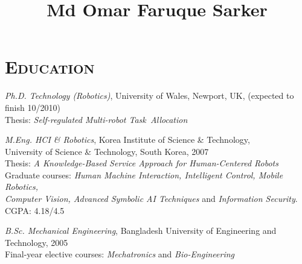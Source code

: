 \documentclass[notopicbreak,contbibnum,plain]{simplecv}
\begin{document}


%
\title{\Large Md Omar Faruque Sarker}
%
\maketitle
\vspace*{-1cm}
\section{\textsc{Education}}
\label{edu}
\begin{topic}
    \item \emph{Ph.D. Technology (Robotics)}, 
    University of Wales, Newport, UK, (expected to finish 10/2010)\\
    Thesis: \textit{Self-regulated Multi-robot 				Task~Allocation}
\vspace*{-0.1cm}
    \item \emph{M.Eng. HCI \& Robotics},  
    Korea Institute of Science \& Technology,\\ University of Science \& Technology, South Korea, 2007\\ 
        Thesis: \textit{A Knowledge-Based Service Approach
for Human-Centered Robots}\\
Graduate courses: \emph{Human Machine Interaction, Intelligent Control, Mobile Robotics,\\ Computer Vision, Advanced Symbolic AI
Techniques} and \emph{Information Security}. CGPA: 4.18/4.5
\vspace*{-0.1cm}
    \item \emph{B.Sc. Mechanical Engineering},
    Bangladesh University of Engineering and Technology, 2005\\       
Final-year elective courses: \emph{Mechatronics} and \emph{Bio-Engineering}
\end{topic}
\end{document}
